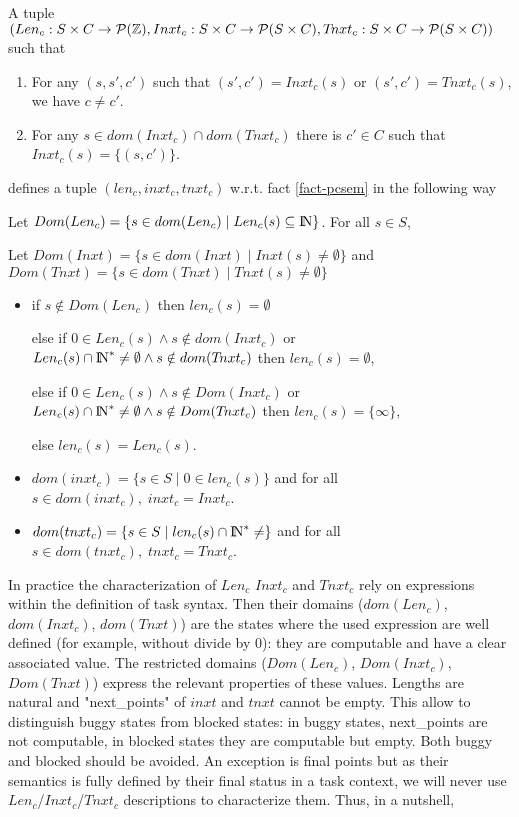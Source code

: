 \documentclass{article}
\newcommand{\NAT}{\mbox{\normalfont I$\!$N}}
\newcommand{\INT}{\mbox{\normalfont $\mathbb{Z}$}}
\begin{document}
\begin{definition}\label{def-crc}$~$\\
A tuple $(Len_c:S\times C\rightarrow {\cal P}(\INT), Inxt_c:S\times C\rightarrow {\cal P}(S\times C), T\!nxt_c:S\times C\rightarrow  {\cal P}(S\times C))$ such that
\begin{enumerate}
		\item For any $(s,s',c')$ such that $(s',c')=Inxt_c(s)$ or $(s',c')=T\!nxt_c(s)$, we have $c\neq c'$.
    \item For any $s\in dom(Inxt_c)\cap dom(T\!nxt_c)$ there is $c'\in C$ such that $Inxt_c(s)=\{(s,c')\}$.
\end{enumerate}

defines a tuple $(len_c,inxt_c,tnxt_c)$ w.r.t. fact \ref{fact-pcsem} in the following way

\vspace{1mm}
Let $Dom(Len_c)=\{s\in dom(Len_c)\mid Len_c(s)\subseteq\NAT\}$. For all $s\in S$,\par
Let $Dom(Inxt)=\{s\in dom(Inxt)\mid Inxt(s)\neq\emptyset\}$ and $Dom(T\!nxt)=\{s\in dom(T\!nxt)\mid T\!nxt(s)\neq\emptyset\}$
\begin{itemize}
\item 
      if $s\notin Dom(Len_c)$ then $len_c(s)=\emptyset$\par
      else if $0\in Len_c(s)\wedge s\notin dom(Inxt_c)$ or $Len_c(s)\cap\NAT^*\neq\emptyset\wedge s\notin dom(T\!nxt_c)$ then $len_c(s)=\emptyset$,\par
      else if $0\in Len_c(s)\wedge s\notin Dom(Inxt_c)$ or $Len_c(s)\cap\NAT^*\neq\emptyset\wedge s\notin Dom(T\!nxt_c)$ then $len_c(s)=\{\infty\}$,\par
			else $len_c(s)=Len_c(s)$.
\item $dom(inxt_c)=\{s\in S\mid 0\in len_c(s)\}$ and for all $s\in dom(inxt_c),\; inxt_c=Inxt_c$.
\item $dom(tnxt_c)=\{s\in S\mid len_c(s)\cap\NAT^*\neq\empty\}$ and for all $s\in dom(tnxt_c),\; tnxt_c=T\!nxt_c$.
\end{itemize}
\end{definition}
In practice the characterization of $Len_c$ $Inxt_c$ and $T\!nxt_c$ rely on expressions within the definition of task syntax. Then their domains ($dom(Len_c)$, $dom(Inxt_c)$, $dom(T\!nxt)$) are the states where the used expression are well defined (for example, without divide by 0): they are computable and have a clear associated value. The restricted domains ($Dom(Len_c)$, $Dom(Inxt_c)$, $Dom(T\!nxt)$) express the relevant properties of these values. Lengths are natural and "next\_points" of $inxt$ and $tnxt$ cannot be empty. This allow to distinguish buggy states from blocked states: in buggy states, next\_points are not computable, in blocked states they are computable but empty. Both buggy and blocked should be avoided. An exception is final points but as their semantics is fully defined by their final status in a task context, we will never use $Len_c$/$Inxt_c$/$T\!nxt_c$ descriptions to characterize them. Thus, in a nutshell,
\end{document}
